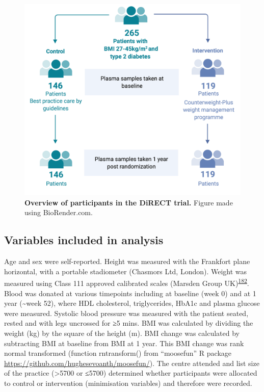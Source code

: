 \documentclass[11pt,twoside]{bristolthesis}
\begin{document}
\begin{figure}

{\centering \includegraphics{figure/DiRECT/DiRECT_study_summary} 

}

\caption[Overview of participants in the DiRECT trial]{\textbf{Overview of participants in the DiRECT trial.} Figure made using BioRender.com.}\label{fig:direct-participants}
\end{figure}
\hypertarget{variables-included-in-analysis}{%
\subsection{Variables included in analysis}\label{variables-included-in-analysis}}

Age and sex were self-reported. Height was measured with the Frankfort plane horizontal, with a portable stadiometer (Chasmors Ltd, London). Weight was measured using Class 111 approved calibrated scales (Marsden Group UK)\textsuperscript{\protect\hyperlink{ref-Leslie2016}{182}}. Blood was donated at various timepoints including at baseline (week 0) and at 1 year (\textasciitilde week 52), where HDL cholesterol, triglycerides, HbA1c and plasma glucose were measured. Systolic blood pressure was measured with the patient seated, rested and with legs uncrossed for ≥5 mins. BMI was calculated by dividing the weight (kg) by the square of the height (m). BMI change was calculated by subtracting BMI at baseline from BMI at 1 year. This BMI change was rank normal transformed (function rntransform() from ``moosefun'' R package \url{https://github.com/hughesevoanth/moosefun/}). The centre attended and list size of the practice (\textgreater5700 or ≤5700) determined whether participants were allocated to control or intervention (minimisation variables) and therefore were recorded.
\end{document}
